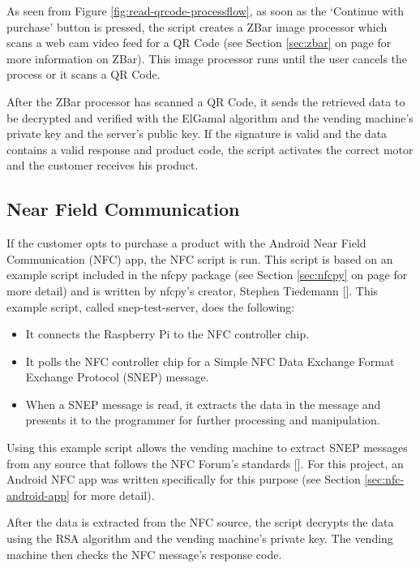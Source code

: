 As seen from Figure \ref{fig:read-qrcode-processflow}, as soon as the `Continue
with purchase' button is pressed, the script creates a ZBar image processor
which scans a web cam video feed for a QR Code (see Section \ref{sec:zbar} on page
\pageref{sec:zbar} for more information on ZBar). This image processor runs until the user
cancels the process or it scans a QR Code. 

After the ZBar processor has scanned a QR Code, it sends the retrieved data to
be decrypted and verified with the ElGamal algorithm and the vending machine's
private key and the server's public key. If the signature is valid and the data
contains a valid response and product code, the script activates the correct
motor and the customer receives his product. 

\subsection{Near Field Communication}

If the customer opts to purchase a product with the Android Near Field
Communication (NFC) app, the NFC script is run. This script is based on an
example script included in the nfcpy package (see Section \ref{sec:nfcpy} on page
\pageref{sec:nfcpy} for more detail) and is written by nfcpy's creator, Stephen Tiedemann
[\cite{website:nfcpy}]. This example script, called snep-test-server, does the
following:

\begin{itemize}
  \item It connects the Raspberry Pi to the NFC controller chip.
  \item It polls the NFC controller chip for a Simple NFC Data Exchange Format
  Exchange Protocol (SNEP) message.
  \item When a SNEP message is read, it extracts the data in the message and
  presents it to the programmer for further processing and manipulation.
\end{itemize}

Using this example script allows the vending machine to extract SNEP messages
from any source that follows the NFC Forum's standards
[\cite{website:nfc-forum}]. For this project, an Android NFC app was written
specifically for this purpose (see Section \ref{sec:nfc-android-app} for more
detail). 

After the data is extracted from the NFC source, the script decrypts the data
using the RSA algorithm and the vending machine's private key. The vending
machine then checks the NFC message's response code. 

